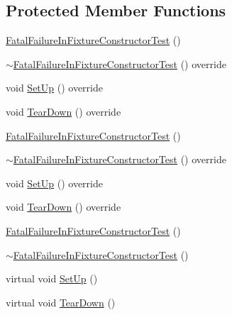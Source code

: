 \subsection*{Protected Member Functions}
\begin{DoxyCompactItemize}
\item 
\mbox{\hyperlink{class_fatal_failure_in_fixture_constructor_test_a1dc9a5fcf0e1f22d614990a0fe2cb504}{Fatal\+Failure\+In\+Fixture\+Constructor\+Test}} ()
\item 
\mbox{\hyperlink{class_fatal_failure_in_fixture_constructor_test_aaf315d8d35b23f4bd04a026fce799de0}{$\sim$\+Fatal\+Failure\+In\+Fixture\+Constructor\+Test}} () override
\item 
void \mbox{\hyperlink{class_fatal_failure_in_fixture_constructor_test_af61931410069b47222d50b8ef90624f2}{Set\+Up}} () override
\item 
void \mbox{\hyperlink{class_fatal_failure_in_fixture_constructor_test_a533465f7e241d56cb21ec11aa94f1908}{Tear\+Down}} () override
\item 
\mbox{\hyperlink{class_fatal_failure_in_fixture_constructor_test_a1dc9a5fcf0e1f22d614990a0fe2cb504}{Fatal\+Failure\+In\+Fixture\+Constructor\+Test}} ()
\item 
\mbox{\hyperlink{class_fatal_failure_in_fixture_constructor_test_aaf315d8d35b23f4bd04a026fce799de0}{$\sim$\+Fatal\+Failure\+In\+Fixture\+Constructor\+Test}} () override
\item 
void \mbox{\hyperlink{class_fatal_failure_in_fixture_constructor_test_af61931410069b47222d50b8ef90624f2}{Set\+Up}} () override
\item 
void \mbox{\hyperlink{class_fatal_failure_in_fixture_constructor_test_a533465f7e241d56cb21ec11aa94f1908}{Tear\+Down}} () override
\item 
\mbox{\hyperlink{class_fatal_failure_in_fixture_constructor_test_a1dc9a5fcf0e1f22d614990a0fe2cb504}{Fatal\+Failure\+In\+Fixture\+Constructor\+Test}} ()
\item 
\mbox{\hyperlink{class_fatal_failure_in_fixture_constructor_test_a514709af7159172a12193a7508683c46}{$\sim$\+Fatal\+Failure\+In\+Fixture\+Constructor\+Test}} ()
\item 
virtual void \mbox{\hyperlink{class_fatal_failure_in_fixture_constructor_test_a006d3ac0e7a4ad3c469c3b41dc7c42c3}{Set\+Up}} ()
\item 
virtual void \mbox{\hyperlink{class_fatal_failure_in_fixture_constructor_test_a2763026a557e1fce4e59bd16c4eced57}{Tear\+Down}} ()
\end{DoxyCompactItemize}
